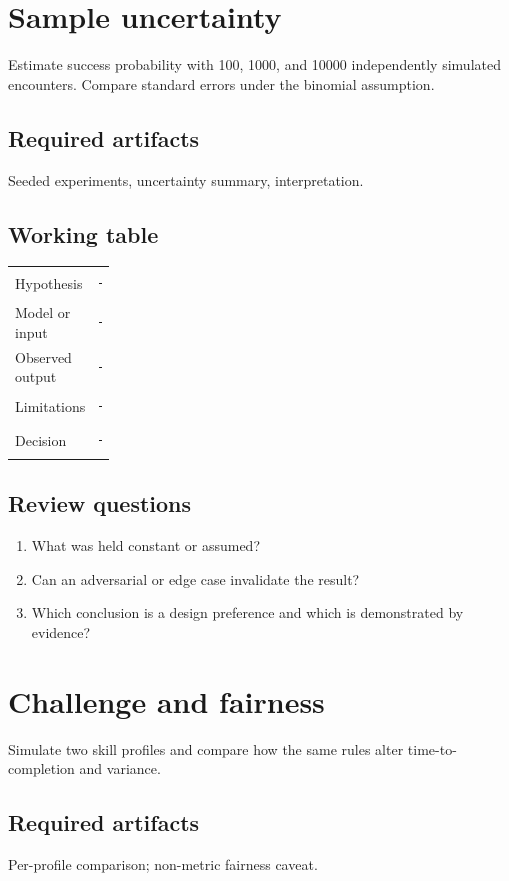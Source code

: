 \documentclass[11pt]{article}
\begin{document}
\section{Sample uncertainty}
Estimate success probability with 100, 1000, and 10000 independently simulated encounters. Compare standard errors under the binomial assumption.


\subsection{Required artifacts}
Seeded experiments, uncertainty summary, interpretation.


\subsection{Working table}
\begin{tabularx}{\linewidth}{@{}p{0.20\linewidth}X@{}}\toprule
Hypothesis & \rule{0.90\linewidth}{0.4pt}\\[0.35cm]
Model or input & \rule{0.90\linewidth}{0.4pt}\\[0.35cm]
Observed output & \rule{0.90\linewidth}{0.4pt}\\[0.35cm]
Limitations & \rule{0.90\linewidth}{0.4pt}\\[0.35cm]
Decision & \rule{0.90\linewidth}{0.4pt}\\\bottomrule\end{tabularx}

\subsection{Review questions}
\begin{enumerate}
\item What was held constant or assumed?
\item Can an adversarial or edge case invalidate the result?
\item Which conclusion is a design preference and which is demonstrated by evidence?
\end{enumerate}

\section{Challenge and fairness}
Simulate two skill profiles and compare how the same rules alter time-to-completion and variance.


\subsection{Required artifacts}
Per-profile comparison; non-metric fairness caveat.
\end{document}
